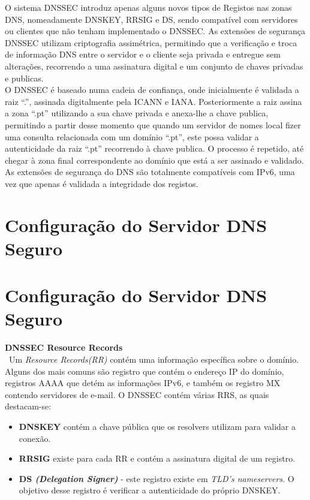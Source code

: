 \documentclass[12pt,openright,a4paper]{report}
\begin{document}
{O sistema DNSSEC introduz apenas alguns novos tipos de Registos nas zonas DNS, nomeadamente DNSKEY, RRSIG e DS, sendo compatível com servidores ou clientes que não tenham implementado o DNSSEC. As extensões de segurança DNSSEC utilizam criptografia assimétrica, permitindo que a verificação e troca de informação DNS entre o servidor e o cliente seja privada e entregue sem alterações, recorrendo a uma assinatura digital e um conjunto de chaves privadas e publicas.\\

O DNSSEC é baseado numa cadeia de confiança, onde inicialmente é validada a raiz “.”, assinada digitalmente pela ICANN e IANA. Posteriormente a raiz assina a zona “.pt” utilizando a sua chave privada e anexa-lhe a chave publica, permitindo a partir desse momento que quando um servidor de nomes local fizer uma consulta relacionada com um domínio “.pt”, este possa validar a autenticidade da raiz “.pt” recorrendo à chave publica. O processo é repetido, até chegar à zona final correspondente ao domínio que está a ser assinado e validado. As extensões de segurança do DNS são totalmente compatíveis com IPv6, uma vez que apenas é validada a integridade dos registos.

\section{Configuração do Servidor DNS Seguro}
\label{sec_config_segura}

\section{Configuração do Servidor DNS Seguro}
\label{sec_config_segura}

\textbf{DNSSEC Resource Records}
\\\ Um \textit{ Resource Records(RR)} contém uma informação específica sobre o domínio. Alguns dos mais comuns são registro que contém o endereço IP do domínio, registros AAAA que detém as informações IPv6, e também os registro MX contendo servidores de e-mail. O DNSSEC contém várias RRS, as quais destacam-se:

\begin{itemize}
\item \textbf{DNSKEY} contém a chave pública que os resolvers utilizam para validar a conexão.
\item \textbf{RRSIG} existe para cada RR e contém a assinatura digital de um registro.
\item \textbf{DS \textit{(Delegation Signer)}} - este registro existe em \textit{TLD's nameservers}. O objetivo desse registro é verificar a autenticidade do próprio DNSKEY.
\end{itemize}

}
\end{document}
